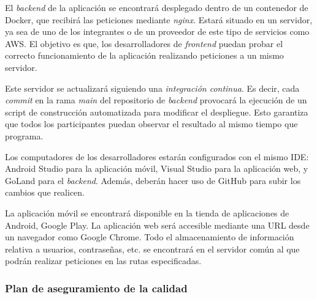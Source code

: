\documentclass{article}
\begin{document}

El \textit{backend} de la aplicación se encontrará desplegado dentro de un contenedor de Docker, que recibirá las peticiones mediante \emph{nginx}. Estará situado en un servidor, ya sea de uno de los integrantes o de un proveedor de este tipo de servicios como AWS. El objetivo es que, los desarrolladores de \textit{frontend} puedan probar el correcto funcionamiento de la aplicación realizando peticiones a un mismo servidor.

Este servidor se actualizará siguiendo una \emph{integración continua}. Es decir, cada \textit{commit} en la rama \textit{main} del repositorio de \textit{backend} provocará la ejecución de un script de construcción automatizada para modificar el despliegue. Esto garantiza que todos los participantes puedan observar el resultado al mismo tiempo que programa.

Los computadores de los desarrolladores estarán configurados con el mismo IDE: Android Studio para la aplicación móvil, Visual Studio para la aplicación web, y GoLand para el \textit{backend}. Además, deberán hacer uso de GitHub para subir los cambios que realicen.

La aplicación móvil se encontrará disponible en la tienda de aplicaciones de Android, Google Play. La aplicación web será accesible mediante una URL desde un navegador como Google Chrome. Todo el almacenamiento de información relativa a usuarios, contraseñas, etc. se encontrará en el servidor común al que podrán realizar peticiones en las rutas especificadas.


\subsubsection{Plan de aseguramiento de la calidad}

\end{document}
